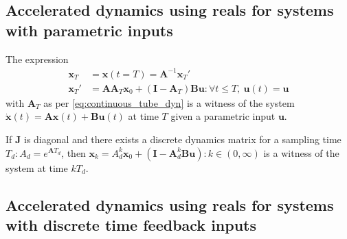 \documentclass[sigconf]{llncs}
\newcommand{\mat}[1]{\boldsymbol{#1}}
\renewcommand{\vec}[1]{\boldsymbol{#1}}
\begin{document}
 \subsection{Accelerated dynamics using reals for systems with parametric inputs}\label{sec:real_discrete_param_inputs}
\begin{theorem}
The expression
 \begin{align}
 \vec{x}_T&=\vec{x}(t=T)=\mat{A}^{-1}\vec{x}_T'\nonumber\\
\vec{x}_T'&=\mat{A}\mat{A}_T\vec{x}_0 + (\mat{I}-\mat{A}_T)\mat{B}\vec{u} : \forall t \leq T,\ \vec{u}(t)=\vec{u} 
 \end{align}
 with $\mat{A}_T$ as per \eqref{eq:continuous_tube_dyn} is a witness of the system $\dot{\vec{x}}(t)=\mat{A}\vec{x}(t)+\mat{B}\vec{u}(t)$ at time $T$ given a parametric input $\vec{u}$.
 \end{theorem}
 \begin{corollary}
 If $\mat{J}$ is diagonal and there exists a discrete dynamics matrix for a sampling time $T_d :  A_d=e^{\mat{A} T_d}$, then $\vec{x}_k=A_d^k\vec{x}_0+(\mat{I}-\mat{A}_d^k\mat{B}\vec{u}) : k \in (0,\infty)$ is a witness of the system at time $kT_d$.
 \end{corollary}

 \subsection{Accelerated dynamics using reals for systems with discrete time feedback inputs}\label{sec:real_discrete_feedback_inputs}
\end{document}

